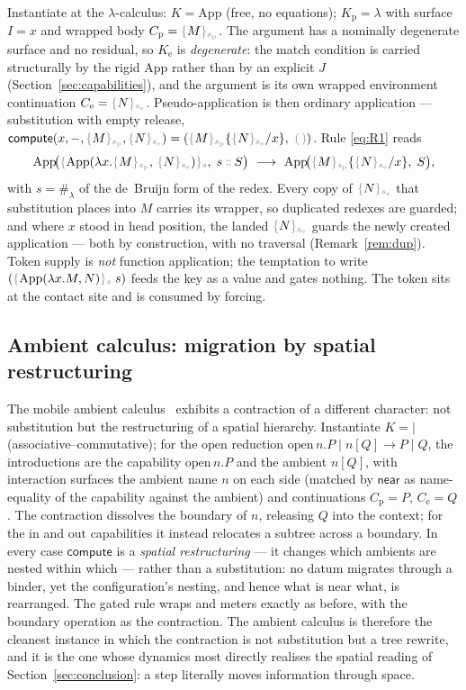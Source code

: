 \documentclass[11pt]{article}
\theoremstyle{definition}
\theoremstyle{plain}
\newcommand{\dec}[1]{\textcolor{costgray}{#1}}   %
\newcommand{\near}{\mathsf{near}}
\newcommand{\sgn}[2]{\dec{\{}{#1}\dec{\}_{#2}}}  %
\newcommand{\cons}{\mathbin{\dec{\dblcolon}}}  %
\newcommand{\nil}{\dec{(\,)}}                  %
\newcommand{\red}{\longrightarrow}
\newcommand{\hashf}{\#}
\newcommand{\subst}[3]{#1\{#2/#3\}}
\newcommand{\compute}{\mathsf{compute}}
\newcommand{\Kp}{K_{\mathrm{p}}}
\newcommand{\Ke}{K_{\mathrm{e}}}
\newcommand{\Par}{\mathbin{|}}
\begin{document}
Instantiate at the $\lambda$-calculus: $K = \mathrm{App}$ (free, no
equations); $\Kp = \lambda$ with surface $I = x$ and wrapped body
$C_{\mathrm p} = \sgn{M}{s_{\mathrm p}}$. The argument has a nominally
degenerate surface and no residual, so $\Ke$ is \emph{degenerate}: the
match condition is carried structurally by the rigid $\mathrm{App}$ rather
than by an explicit $J$ (Section~\ref{sec:capabilities}), and the
argument is its own wrapped environment continuation
$C_{\mathrm e} = \sgn{N}{s_{\mathrm e}}$. Pseudo-application is then
ordinary application --- substitution with empty release,
$\compute(x,-,\sgn{M}{s_{\mathrm p}},\sgn{N}{s_{\mathrm e}}) =
(\subst{\sgn{M}{s_{\mathrm p}}}{\sgn{N}{s_{\mathrm e}}}{x},\ \nil)$. Rule
\eqref{eq:R1} reads
%
\[
  \mathrm{App}\!\bigl(
    \sgn{\mathrm{App}(\lambda x.\sgn{M}{s_{\mathrm p}},\,
                      \sgn{N}{s_{\mathrm e}})}{s},
    \; s\cons S\bigr)
  \ \red\
  \mathrm{App}\!\bigl(\subst{\sgn{M}{s_{\mathrm p}}}{\sgn{N}{s_{\mathrm e}}}{x},\; S\bigr),
\]
%
with $s = \hashf_\lambda$ of the de~Bruijn form of the redex. Every copy
of $\sgn{N}{s_{\mathrm e}}$ that substitution places into $M$ carries its
wrapper, so duplicated redexes are guarded; and where $x$ stood in head
position, the landed $\sgn{N}{s_{\mathrm e}}$ guards the newly created
application --- both by construction, with no traversal
(Remark~\ref{rem:dup}). Token supply is \emph{not} function application;
the temptation to write $(\sgn{\mathrm{App}(\lambda x.M,N)}{s}\; s)$ feeds
the key as a value and gates nothing. The token sits at the contact site
and is consumed by forcing.

\subsection{Ambient calculus: migration by spatial restructuring}

The mobile ambient calculus~\cite{CardelliGordon2000} exhibits a
contraction of a different character: not substitution but the
restructuring of a spatial hierarchy. Instantiate $K = {\Par}$
(associative--commutative); for the $\mathrm{open}$ reduction
$\mathrm{open}\,n.P \mathbin{|} n[Q] \to P \mathbin{|} Q$, the
introductions are the capability $\mathrm{open}\,n.P$ and the ambient
$n[Q]$, with interaction surfaces the ambient name $n$ on each side
(matched by $\near$ as name-equality of the capability against the
ambient) and continuations $C_{\mathrm p} = P$, $C_{\mathrm e} = Q$. The
contraction dissolves the boundary of $n$, releasing $Q$ into the context;
for the $\mathrm{in}$ and $\mathrm{out}$ capabilities it instead relocates
a subtree across a boundary. In every case $\compute$ is a
\emph{spatial restructuring} --- it changes which ambients are nested
within which --- rather than a substitution: no datum migrates through a
binder, yet the configuration's nesting, and hence what is near what, is
rearranged. The gated rule wraps and meters exactly as before, with the
boundary operation as the contraction. The ambient calculus is therefore
the cleanest instance in which the contraction is not substitution but a
tree rewrite, and it is the one whose dynamics most directly realises the
spatial reading of Section~\ref{sec:conclusion}: a step literally moves
information through space.
\end{document}
